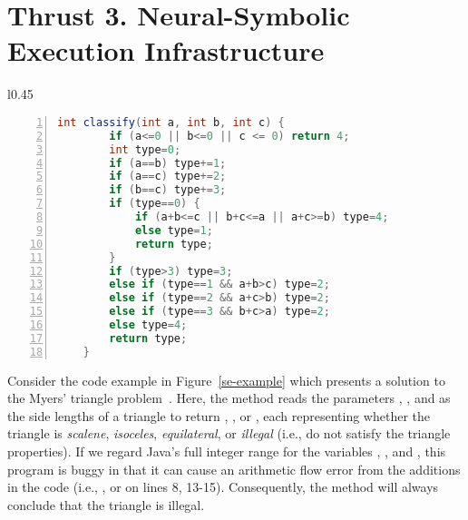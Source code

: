 \section{Thrust 3. Neural-Symbolic Execution Infrastructure}
\label{sec:thrust3}


\begin{wrapfigure}{l}{0.45\textwidth}
\begin{lstlisting}[basicstyle=\scriptsize\sffamily, stepnumber=1, numbers=left, numbersep=-6pt, framexleftmargin=0mm, framexrightmargin=0mm, language=Java, emph ={a, b, c}]
    int classify(int a, int b, int c) {
        if (a<=0 || b<=0 || c <= 0) return 4;
        int type=0;
        if (a==b) type+=1;
        if (a==c) type+=2;
        if (b==c) type+=3;
        if (type==0) {
            if (a+b<=c || b+c<=a || a+c>=b) type=4;
            else type=1;
            return type;
        }
        if (type>3) type=3;
        else if (type==1 && a+b>c) type=2;
        else if (type==2 && a+c>b) type=2;
        else if (type==3 && b+c>a) type=2;
        else type=4;
        return type;
    }
\end{lstlisting}
\vspace{-0.1in}
\caption{Solution for Myers' triangle problem~\cite{10.1145/2338965.2336773}}
\label{se-example}
\end{wrapfigure}

Consider the code example in Figure~\ref{se-example} which presents a solution to the Myers' triangle problem~\cite{Myers.2012}. Here, the method  reads the parameters , , and  as the side lengths of a triangle to return , ,  or , each representing whether the triangle is \textit{scalene}, \textit{isoceles}, \textit{equilateral}, or \textit{illegal} (i.e., do not satisfy the triangle properties). If we regard Java's full integer range for the variables , , and , this program is buggy in that it can cause an arithmetic flow error from the additions in the code (i.e., ,  or  on lines 8, 13-15). Consequently, the method will always conclude that the triangle is illegal. 


